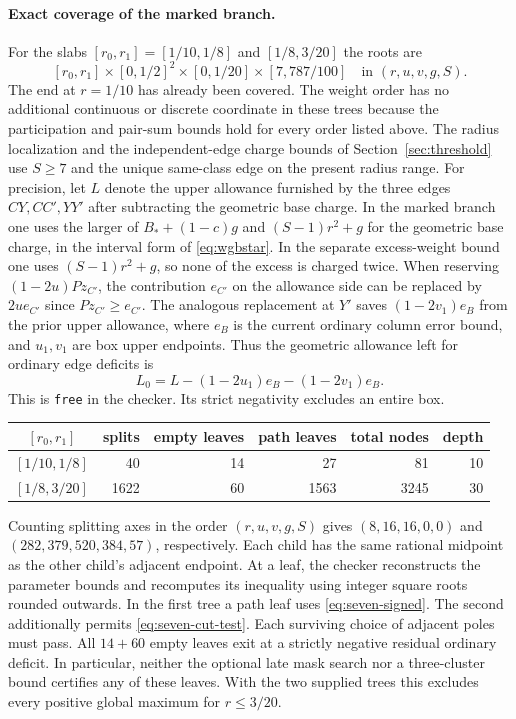 \documentclass[11pt,a4paper]{article}
\theoremstyle{definition}
\begin{document}
\paragraph{Exact coverage of the marked branch.}
For the slabs $[r_0,r_1]=[1/10,1/8]$ and $[1/8,3/20]$ the roots are
\[
 [r_0,r_1]\times[0,1/2]^2\times[0,1/20]\times[7,787/100]
                  \quad\text{in }(r,u,v,g,S).
\]
The end at $r=1/10$ has already been covered. The weight order has
no additional continuous or discrete coordinate in these trees because the
participation and pair-sum bounds hold for every order listed above.
The radius localization and the independent-edge charge bounds of
Section~\ref{sec:threshold} use $S\ge7$ and the unique same-class edge
on the present radius range. For precision, let $L$ denote the upper
allowance furnished by the three edges $CY,CC',YY'$ after subtracting
the geometric base charge. In the marked branch one uses the larger of
$B_*+(1-c)g$ and $(S-1)r^2+g$ for the geometric base charge, in the
interval form of \eqref{eq:wgbstar}. In the separate excess-weight
bound one uses $(S-1)r^2+g$, so none of the excess is charged twice.
When reserving $(1-2u)Pz_{C'}$, the contribution $e_{C'}$ on the
allowance side can be replaced by $2u e_{C'}$ since $Pz_{C'}\ge e_{C'}$.
The analogous replacement at $Y'$ saves $(1-2v_1)e_B$ from the prior
upper allowance, where $e_B$ is the current ordinary column error bound,
and $u_1,v_1$ are box upper endpoints. Thus the geometric allowance
left for ordinary edge deficits is
\[
                L_0=L-(1-2u_1)e_B-(1-2v_1)e_B .
\]
This is \texttt{free} in the checker. Its strict negativity excludes
an entire box.
\begin{center}
\begin{tabular}{c|r|r|r|r|r}
$[r_0,r_1]$&splits&empty leaves&path leaves&total nodes&depth\\\hline
$[1/10,1/8]$&40&14&27&81&10\\
$[1/8,3/20]$&1622&60&1563&3245&30
\end{tabular}
\end{center}
Counting splitting axes in the order $(r,u,v,g,S)$ gives
$(8,16,16,0,0)$ and $(282,379,520,384,57)$, respectively.
Each child has the same rational midpoint as the other child's adjacent
endpoint. At a leaf, the checker reconstructs the parameter bounds and
recomputes its inequality using integer square roots rounded outwards.
In the first tree a path leaf uses \eqref{eq:seven-signed}. The second
additionally permits \eqref{eq:seven-cut-test}. Each surviving choice
of adjacent poles must pass. All $14+60$ empty leaves exit at a strictly
negative residual ordinary deficit. In particular, neither the optional
late mask search nor a three-cluster bound certifies any of these
leaves. With the two supplied trees this excludes every positive global
maximum for $r\le3/20$.
\end{document}
